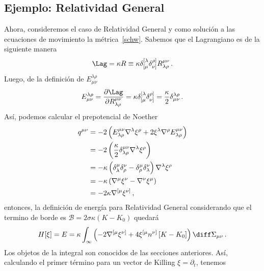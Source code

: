 \documentclass[../Main.tex]{subfiles}
\begin{document}
\subsection{Ejemplo: Relatividad General}
Ahora, consideremos el caso de Relatividad General y como solución a las ecuaciones de movimiento la métrica~\eqref{schw}. Sabemos que el Lagrangiano es de la siguiente manera
\begin{align}
    \Lag=\kappa R\equiv\kappa \delta^{[\lambda}_{[\mu}\delta^{\rho]}_{\nu]}R^{\mu\nu}_{\lambda\rho}\, .
\end{align}
Luego, de la definición de $E^{\lambda\rho}_{\mu\nu}$ 
\begin{align}
E^{\lambda\rho}_{\mu\nu}=\frac{\partial\Lag}{\partial R^{\mu\nu}_{\lambda \rho}}=\kappa \delta^{[\lambda}_{[\mu}\delta^{\rho]}_{\nu]}=\frac{\kappa}{2}\delta^{\lambda\rho}_{\mu\nu}\, .
\end{align}
Así, podemos calcular el prepotencial de Noether 
\begin{align}\notag
q^{\mu \nu} &=-2\left(E_{\lambda \rho}^{\mu \nu} \nabla^\lambda \xi^\rho+2 \xi^\lambda \nabla^\rho E_{\lambda \rho}^{\mu \nu}\right) \\ \notag
&=-2\left(\frac{\kappa }{2} \delta_{\lambda \rho}^{\mu \nu} \nabla^\lambda \xi^\rho\right) \\ \notag
&=-\kappa\left(\delta_\lambda^\mu \delta_\rho^\nu-\delta_\rho^\mu \delta_{\lambda}^\nu\right) \nabla^\lambda \xi^\rho \\ \notag
&=-\kappa\left(\nabla^\mu \xi^\nu-\nabla^\nu \xi^\mu\right)\\
&=-2\kappa\nabla^{[\mu}\xi^{\nu]} \, ,
\end{align}
entonces, la definición de energía para Relatividad General considerando que el termino de borde es $\mathcal{B}=2 \sigma \kappa (K-K_0)$ quedará
\begin{align}
H[\xi]=E=\kappa\int_{\infty}\left(-2\nabla^{[\mu}\xi^{\nu]}+4  \xi^{[\mu} n^{\nu]} \left[K-K_0\right]\right) \diff\Sigma_{\mu\nu}\, .
\end{align}
Los objetos de la integral son conocidos de las secciones anteriores. Así, calculando el primer término para un vector de Killing $\xi=\partial_{t}$, tenemos 
\end{document}
